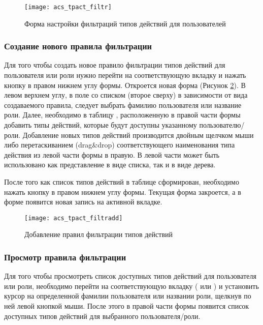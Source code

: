 \begin{figure}[ht]\centering
 \texttt{[image: acs\_tpact\_filtr]}
 \caption{Форма настройки фильтраций типов действий для пользователей}
 \label{img_acs_tpact_filtr}
\end{figure}

\subsubsection{Создание нового правила фильтрации} \label{acs_tpactfiltr}

Для того чтобы создать новое правило фильтрации типов действий для пользователя или роли нужно перейти на соответствующую вкладку и нажать кнопку  в правом нижнем углу формы. Откроется новая форма  (Рисунок \ref{img_acs_tpact_filtradd}). В левом верхнем углу, в поле со списком (второе сверху) в зависимости от вида создаваемого правила, следует выбрать фамилию пользователя или название роли. Далее, необходимо в таблицу , расположенную в правой части формы добавить типы действий, которые будут доступны указанному пользователю/роли. Добавление новых типов действий производится двойным щелчком мыши либо перетаскиванием (drag\&drop) соответствующего наименования типа действия из левой части формы в правую. В левой части может быть использовано как представление в виде списка, так и в виде дерева.

После того как список типов действий в таблице  сформирован, необходимо нажать кнопку   в правом нижнем углу формы. Текущая форма закроется, а в форме  появится новая запись на активной вкладке.

\begin{figure}[ht]\centering
 \texttt{[image: acs\_tpact\_filtradd]}
 \caption{Добавление правил фильтрации типов действий}
 \label{img_acs_tpact_filtradd}
\end{figure}

\subsubsection{Просмотр правила фильтрации}

Для того чтобы просмотреть список доступных типов действий для пользователя или роли, необходимо перейти на соответствующую вкладку ( или ) и установить курсор на определенной фамилии пользователя или названии роли, щелкнув по ней левой кнопкой мыши. После этого в правой части формы появится список доступных типов действий для выбранного пользователя/роли.

